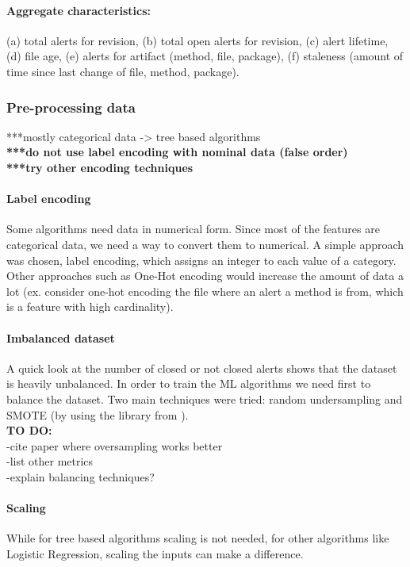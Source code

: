 \documentclass{article}
\begin{document}
\paragraph{Aggregate characteristics:} (a) total alerts for revision, (b) total open alerts for revision, (c) alert lifetime, (d) file age, (e) alerts for artifact (method, file, package), (f) staleness (amount of time since last change of file, method, package).


\subsubsection{Pre-processing data}

***mostly categorical data -> tree based algorithms\\
\textbf{***do not use label encoding with nominal data (false order)}\\
\textbf{***try other encoding techniques}

\paragraph{Label encoding} Some algorithms need data in numerical form. Since most of the features are categorical data, we need a way to convert them to numerical. A simple approach was chosen, label encoding, which assigns an integer to each value of a category. Other approaches such as One-Hot encoding would increase the amount of data a lot (ex. consider one-hot encoding the file where an alert a method is from, which is a feature with high cardinality).

\paragraph{Imbalanced dataset} A quick look at the number of closed or not closed alerts shows that the dataset is heavily unbalanced. In order to train the ML algorithms we need first to balance the dataset. Two main techniques were tried: random undersampling and SMOTE (by using the library from \cite{imblearn}).\\

\textbf{TO DO:}\\
-cite paper where oversampling works better\\
-list other metrics\\
-explain balancing techniques?

\paragraph{Scaling} While for tree based algorithms scaling is not needed, for other algorithms like Logistic Regression, scaling the inputs can make a difference.
\end{document}
